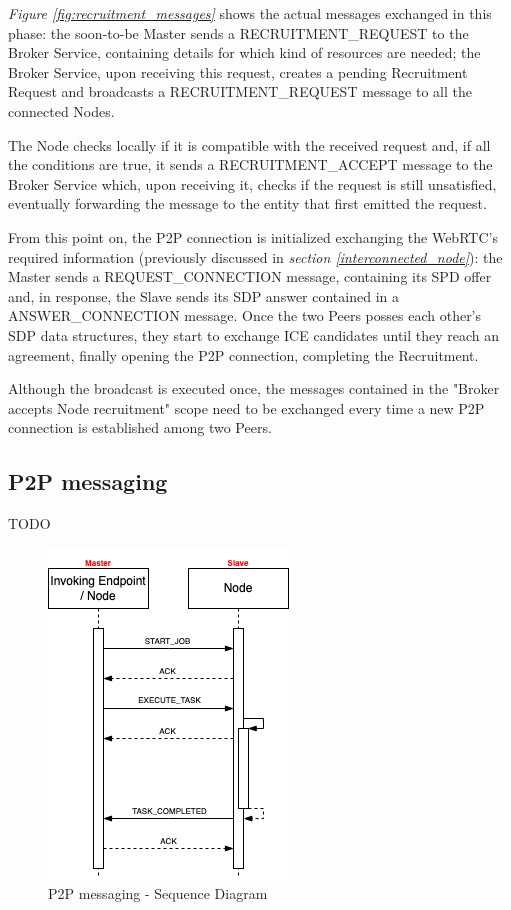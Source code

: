 \textit{Figure \ref{fig:recruitment_messages}} shows the actual messages exchanged in this phase: the soon-to-be Master sends a RECRUITMENT\_REQUEST to the Broker Service, containing details for which kind of resources are needed; the Broker Service, upon receiving this request, creates a pending Recruitment Request and broadcasts a RECRUITMENT\_REQUEST message to all the connected Nodes.

The Node checks locally if it is compatible with the received request and, if all the conditions are true, it sends a RECRUITMENT\_ACCEPT message to the Broker Service which, upon receiving it, checks if the request is still unsatisfied, eventually forwarding the message to the entity that first emitted the request.

From this point on, the P2P connection is initialized exchanging the WebRTC's required information (previously discussed in \textit{section \ref{interconnected_node}}): the Master sends a REQUEST\_CONNECTION message, containing its SPD offer and, in response, the Slave sends its SDP answer contained in a ANSWER\_CONNECTION message. Once the two Peers posses each other's SDP data structures, they start to exchange ICE candidates until they reach an agreement, finally opening the P2P connection, completing the Recruitment.

Although the broadcast is executed once, the messages contained in the "Broker accepts Node recruitment" scope need to be exchanged every time a new P2P connection is established among two Peers.

\subsection{P2P messaging}
TODO
\begin{figure}[!ht]
    \centering
    \includegraphics[scale=0.8]{document/chapters/chapter_7/images/p2p_messages.png}
    \caption{P2P messaging - Sequence Diagram}
    \label{fig:p2p_messages}
\end{figure}